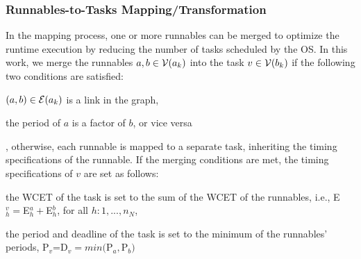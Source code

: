 \subsubsection{Runnables-to-Tasks Mapping/Transformation}\label{subsec_runnables-to-tasks}
In the mapping process, one or more runnables can be merged to optimize the runtime execution by reducing the number of tasks scheduled by the OS. In this work, we merge the runnables $a,b\in \mathcal{V}(a_{k})$ into the task $v\in \mathcal{V}(b_{k})$ if the following two conditions are satisfied:
\begin{enumerate*}[label=(\roman*)]
	\item $(a,b)\in \mathcal{E}(a_{k})$ is a link in the graph,
	\item the period of $a$ is a factor of $b$, or vice versa
\end{enumerate*}
, otherwise, each runnable is mapped to a separate task, inheriting the timing specifications of the runnable.
If the merging conditions are met, the timing specifications of $v$ are set as follows: 
\begin{enumerate*}[label=(\roman*)]
	\item the WCET of the task is set to the sum of the WCET of the runnables, i.e., E$_h^v=$E$_h^a + $E$_h^b$, for all $h:1,...,n_N$,
	\item the period and deadline of the task is set to the minimum of the runnables' periods, P$_v$=D$_v=min($P$_a, $P$_b)$
\end{enumerate*}
